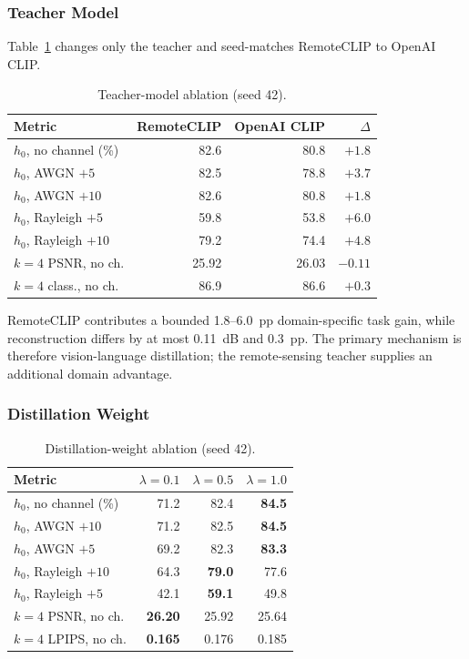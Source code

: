 \documentclass[letterpaper,journal]{IEEEtran}
\newcommand{\pp}{~pp\xspace}
\begin{document}
\subsubsection{Teacher Model}
Table~\ref{tab:teacher} changes only the teacher and seed-matches RemoteCLIP to OpenAI CLIP.

\begin{table}[!t]
\centering
\caption{Teacher-model ablation (seed 42).}
\label{tab:teacher}
\scriptsize
\begin{tabular}{@{}lrrr@{}}
\toprule
Metric & RemoteCLIP & OpenAI CLIP & $\Delta$ \\ \midrule
$h_0$, no channel (\%) & 82.6 & 80.8 & $+1.8$ \\
$h_0$, AWGN $+5$ & 82.5 & 78.8 & $+3.7$ \\
$h_0$, AWGN $+10$ & 82.6 & 80.8 & $+1.8$ \\
$h_0$, Rayleigh $+5$ & 59.8 & 53.8 & $+6.0$ \\
$h_0$, Rayleigh $+10$ & 79.2 & 74.4 & $+4.8$ \\
$k=4$ PSNR, no ch. & 25.92 & 26.03 & $-0.11$ \\
$k=4$ class., no ch. & 86.9 & 86.6 & $+0.3$ \\ \bottomrule
\end{tabular}
\end{table}

RemoteCLIP contributes a bounded 1.8--6.0\pp domain-specific task gain, while reconstruction differs by at most 0.11~dB and 0.3\pp. The primary mechanism is therefore vision-language distillation; the remote-sensing teacher supplies an additional domain advantage.

\subsubsection{Distillation Weight}
\begin{table}[!t]
\centering
\caption{Distillation-weight ablation (seed 42).}
\label{tab:lambda}
\scriptsize
\begin{tabular}{@{}lrrr@{}}
\toprule
Metric & $\lambda=0.1$ & $\lambda=0.5$ & $\lambda=1.0$ \\ \midrule
$h_0$, no channel (\%) & 71.2 & 82.4 & \textbf{84.5} \\
$h_0$, AWGN $+10$ & 71.2 & 82.5 & \textbf{84.5} \\
$h_0$, AWGN $+5$ & 69.2 & 82.3 & \textbf{83.3} \\
$h_0$, Rayleigh $+10$ & 64.3 & \textbf{79.0} & 77.6 \\
$h_0$, Rayleigh $+5$ & 42.1 & \textbf{59.1} & 49.8 \\
$k=4$ PSNR, no ch. & \textbf{26.20} & 25.92 & 25.64 \\
$k=4$ LPIPS, no ch. & \textbf{0.165} & 0.176 & 0.185 \\ \bottomrule
\end{tabular}
\end{table}
\end{document}
